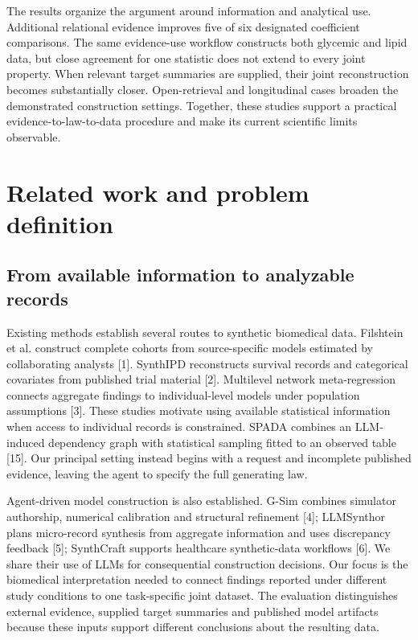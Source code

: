 \documentclass[10pt,twocolumn]{article}
\begin{document}
The results organize the argument around information and analytical use. Additional relational evidence improves five of six designated coefficient comparisons. The same evidence-use workflow constructs both glycemic and lipid data, but close agreement for one statistic does not extend to every joint property. When relevant target summaries are supplied, their joint reconstruction becomes substantially closer. Open-retrieval and longitudinal cases broaden the demonstrated construction settings. Together, these studies support a practical evidence-to-law-to-data procedure and make its current scientific limits observable.


\section{Related work and problem definition}

\subsection{From available information to analyzable records}

Existing methods establish several routes to synthetic biomedical data. Filshtein et al. construct complete cohorts from source-specific models estimated by collaborating analysts [1]. SynthIPD reconstructs survival records and categorical covariates from published trial material [2]. Multilevel network meta-regression connects aggregate findings to individual-level models under population assumptions [3]. These studies motivate using available statistical information when access to individual records is constrained. SPADA combines an LLM-induced dependency graph with statistical sampling fitted to an observed table [15]. Our principal setting instead begins with a request and incomplete published evidence, leaving the agent to specify the full generating law.


Agent-driven model construction is also established. G-Sim combines simulator authorship, numerical calibration and structural refinement [4]; LLMSynthor plans micro-record synthesis from aggregate information and uses discrepancy feedback [5]; SynthCraft supports healthcare synthetic-data workflows [6]. We share their use of LLMs for consequential construction decisions. Our focus is the biomedical interpretation needed to connect findings reported under different study conditions to one task-specific joint dataset. The evaluation distinguishes external evidence, supplied target summaries and published model artifacts because these inputs support different conclusions about the resulting data.
\end{document}
